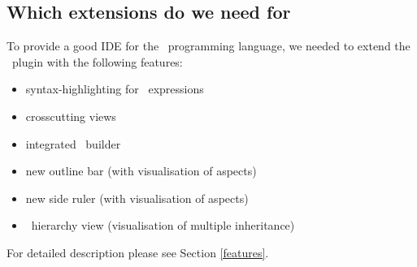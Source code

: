 \subsection{Which extensions do we need for \caesarj}
To provide a good IDE for the \caesarj ~programming language, we needed to extend the \jdt ~plugin with the following features:

\begin{itemize}
	\item syntax-highlighting for \caesarj ~expressions
	\item crosscutting views
	\item integrated \caesarj ~builder
	\item new outline bar (with visualisation of aspects)
	\item new side ruler (with visualisation of aspects)
	\item \caesarj ~hierarchy view (visualisation of multiple inheritance)
\end{itemize}
For detailed description please see Section \ref{features}.



